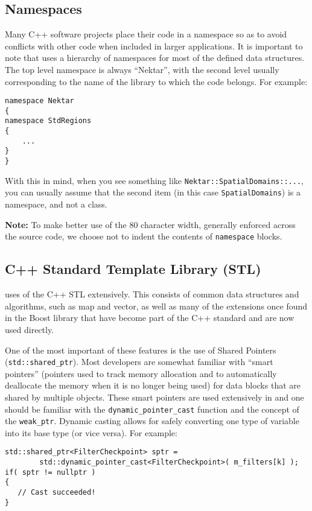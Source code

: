 \subsection{Namespaces}
Many C++ software projects place their code in a namespace so as to avoid conflicts with other code when included in larger applications.  It is important to note that {\nek} uses a hierarchy of namespaces for most of the defined data structures.  The top level namespace is always ``Nektar'', with the second level usually corresponding to the name of the library to which the code belongs. For example:
\begin{lstlisting}
namespace Nektar
{
namespace StdRegions
{
    ...
}
}
\end{lstlisting}

With this in mind, when you see something like \lstinline{Nektar::SpatialDomains::...}, you can usually assume that the second item (in this case \lstinline{SpatialDomains}) is a namespace, and not a class.

\textbf{Note:} To make better use of the 80 character width, generally enforced across the {\nek} source code, we choose not to indent the contents of \lstinline|namespace| blocks.


\subsection{C++ Standard Template Library (STL) }
{\nek} uses of the C++ STL extensively.  This consists of common data structures and algorithms, such as map and vector, as well as many of the extensions once found in the Boost library that have become part of the C++ standard and are now used directly.

One of the most important of these features is
the use of Shared Pointers (\lstinline|std::shared_ptr|).  Most developers are
somewhat familiar with ``smart pointers'' (pointers used to track
memory allocation and to automatically deallocate the memory when it
is no longer being used) for data blocks that are shared by multiple
objects. These smart pointers are used extensively in {\nek} and
one should be familiar with the \lstinline|dynamic_pointer_cast| function
and the concept of the \lstinline|weak_ptr|.  Dynamic casting allows for safely
converting one type of variable into its base type (or vice
versa). For example:
\begin{lstlisting}
std::shared_ptr<FilterCheckpoint> sptr =
        std::dynamic_pointer_cast<FilterCheckpoint>( m_filters[k] );
if( sptr != nullptr ) 
{ 
   // Cast succeeded!
}
\end{lstlisting}

